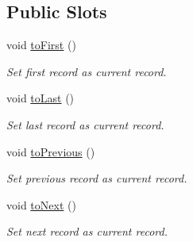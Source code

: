 \subsection*{Public Slots}
\begin{DoxyCompactItemize}
\item 
void \hyperlink{classmdt_sql_data_widget_controller_ac1b3036261ef9c3957b23aa1b5145a77}{to\-First} ()
\begin{DoxyCompactList}\small\item\em Set first record as current record. \end{DoxyCompactList}\item 
void \hyperlink{classmdt_sql_data_widget_controller_a9303e2e10025d9c4c41c4e00e6b804f5}{to\-Last} ()
\begin{DoxyCompactList}\small\item\em Set last record as current record. \end{DoxyCompactList}\item 
void \hyperlink{classmdt_sql_data_widget_controller_a5fd979fc55228bf7d74bf50d1bb34356}{to\-Previous} ()
\begin{DoxyCompactList}\small\item\em Set previous record as current record. \end{DoxyCompactList}\item 
void \hyperlink{classmdt_sql_data_widget_controller_a3b7f53030358f3598b8de769f14ad597}{to\-Next} ()
\begin{DoxyCompactList}\small\item\em Set next record as current record. \end{DoxyCompactList}\end{DoxyCompactItemize}
